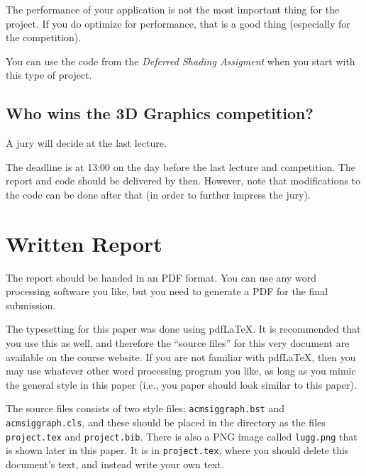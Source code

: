 \documentclass{acmsiggraph}               %
\begin{document}
The performance of your application is not the most important thing for the project. If you do
optimize for performance, that is a good thing (especially for the competition).

You can use the code from the \textit{Deferred Shading Assigment} when you start with this type of project.

\subsection{Who wins the 3D Graphics competition?}
A jury will decide at the last lecture.

The deadline is at 13:00 on the day before the last lecture and competition.
The report and code should be delivered by then. However, note that modifications
to the code can be done after that (in order to further impress the jury).

\section{Written Report}

The report should be handed in an PDF format. You can use any word processing software you like, but you need to generate a PDF for the final submission.

The typesetting for this paper was done using pdf\LaTeX. It is recommended that you
use this as well, and therefore the ``source files'' for this very document are
available on the course website. If you are not familiar with pdf\LaTeX, then
you may use whatever other word processing program you like, as long as you mimic
the general style in this paper (i.e., you paper should look similar to
this paper).

The source files consists of two style files: \texttt{acmsiggraph.bst}
and \texttt{acmsiggraph.cls}, and these should be placed in the directory as the
files \texttt{project.tex} and \texttt{project.bib}. There is also a PNG image called
\texttt{lugg.png} that is shown later in this paper.
It is in \texttt{project.tex}, where you should delete this document's text,
and instead write your own text.
\end{document}
